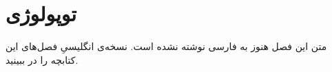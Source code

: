 \chapter{توپولوژی}
\label{ch:09-topology-fa-01}

متن این فصل هنوز به فارسی نوشته نشده است. نسخه‌ی انگلیسیِ فصل‌های این کتابچه را در  ببینید.
